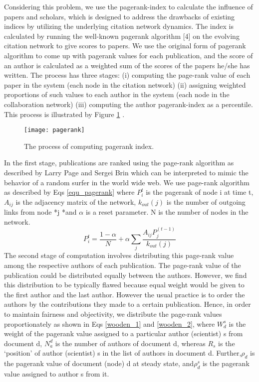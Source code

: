 \documentclass[conference]{IEEEtran}
\begin{document}
Considering this problem, we use the pagerank-index to calculate the influence of papers and scholars, which is designed to address the drawbacks of existing indices by utilizing the underlying citation network dynamics. The index is calculated by running the well-known pagerank algorithm [4] on the evolving citation network to give scores to papers.  We use the original form of pagerank algorithm to come up with pagerank values for each publication, and the score of an author is calculated as a weighted sum of the scores of the papers he/she has written. The process has three stages: (i) computing the page-rank value of each paper in the system (each node in the citation network) (ii) assigning weighted proportions of such values to each author in the system (each node in the collaboration network) (iii) computing the author pagerank-index as a percentile. This process is illustrated by Figure \ref{fig_pagerank} .
\begin{figure}[h]
\centering
\texttt{[image: pagerank]}
\caption{The process of computing pagerank index.}
\label{fig_pagerank}	
\end{figure}
In the first stage, publications are ranked using the page-rank algorithm as described by Larry Page and Sergei Brin \cite{page1999pagerank} which can be interpreted to mimic the behavior of a random surfer in the world wide web. We use page-rank algorithm as described by Eqs \ref{equ_pagerank} where $P_i^t$ is the pagerank of node i at time t, $A_{ij}$ is the adjacency matrix of the network, $k_{out}(j)$ is the number of outgoing links from node *j *and $\alpha$ is a reset parameter. N is the number of nodes in the network.
\begin{equation}
	P_i^t = \frac{1-\alpha}{N}+ \alpha \sum_j \frac{A_{ij}P_j^{(t-1)}}{k_{out}(j)} 
\label{equ_pagerank}
\end{equation}
The second stage of computation involves distributing this page-rank value among the respective authors of each publication. The page-rank value of the publication could be distributed equally between the authors. However, we find this distribution to be typically flawed because equal weight would be given to the first author and the last author. However the usual practice is to order the authors by the contributions they made to a certain publication. Hence, in order to maintain fairness and objectivity, we distribute the page-rank values proportionately as shown in Eqs \ref{wooden_1} and \ref{wooden_2}, where $W_d^s$ is the weight of the pagerank value assigned to a particular author (scientist) s from document d, $N^d_a$  is the number of authors of document d, whereas $R_s$ is the ‘position’ of author (scientist) s in the list of authors in document d. Further,$\rho_d$ is the pagerank value of document (node) d at steady state, and$\rho_d^s$ is the pagerank value assigned to author s from it.
\end{document}
